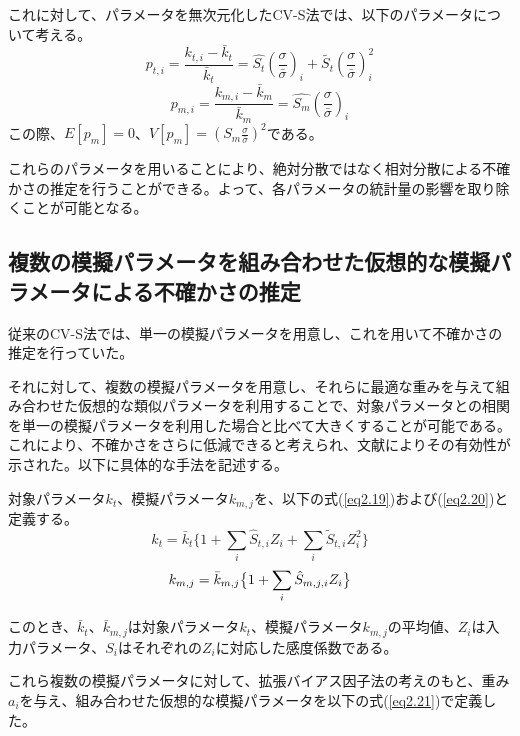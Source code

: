 \documentclass[a4paper,11pt,titlepage,uplatex]{jsreport}
\begin{document}
これに対して、パラメータを無次元化したCV-S法では、以下のパラメータについて考える。
\begin{equation}
  p_{t,i} = \frac{k_{t,i}-\bar{k}_t}{\bar{k}_t} = \hat{S_t} \left(\frac{\sigma}{\bar{\sigma}}\right)_i + \tilde{S_t} \left(\frac{\sigma}{\bar{\sigma}}\right)_i^2 
  \label{eq2.17}
\end{equation}
\begin{equation}
  p_{m,i} = \frac{k_{m,i}-\bar{k}_{m}}{\bar{k}_{m}} = \hat{S_m} \left(\frac{\sigma}{\bar{\sigma}}\right)_i
  \label{eq2.18}
\end{equation}
この際、$E\left[p_m\right] = 0$、$V\left[p_m\right] = \left(S_m \frac{\sigma}{\bar{\sigma}}\right)^2$である。

これらのパラメータを用いることにより、絶対分散ではなく相対分散による不確かさの推定を行うことができる。よって、各パラメータの統計量の影響を取り除くことが可能となる。

\subsection{複数の模擬パラメータを組み合わせた仮想的な模擬パラメータによる不確かさの推定}
従来のCV-S法では、単一の模擬パラメータを用意し、これを用いて不確かさの推定を行っていた。

それに対して、複数の模擬パラメータを用意し、それらに最適な重みを与えて組み合わせた仮想的な類似パラメータを利用することで、対象パラメータとの相関を単一の模擬パラメータを利用した場合と比べて大きくすることが可能である。
これにより、不確かさをさらに低減できると考えられ、文献\cite{kida2022aki}によりその有効性が示された。以下に具体的な手法を記述する。

対象パラメータ$k_t$、模擬パラメータ$k_{m,j}$を、以下の式(\ref{eq2.19})および(\ref{eq2.20})と定義する。
\begin{equation}
  k_{t} = \bar{k}_t \bigl\{ 1 + \sum_{i}\hat{S}_{t,i} Z_i + \sum_{i}\tilde{S}_{t,i} Z_i^2 \bigr\}
  \label{eq2.19}
\end{equation}
\begin{equation}
  k_{m,j} = \bar{k}_{m,j} \bigl\{ 1 + \sum_{i}\Hat{S}_{m,j,i} Z_i  \bigr\}
  \label{eq2.20}
\end{equation}

このとき、$\bar{k}_t$、$\bar{k}_{m,j}$は対象パラメータ$k_t$、模擬パラメータ$k_{m,j}$の平均値、$Z_i$は入力パラメータ、$S_i$はそれぞれの$Z_i$に対応した感度係数である。

これら複数の模擬パラメータに対して、拡張バイアス因子法の考えのもと、重み$a_i$を与え、組み合わせた仮想的な模擬パラメータを以下の式(\ref{eq2.21})で定義した。
\end{document}

